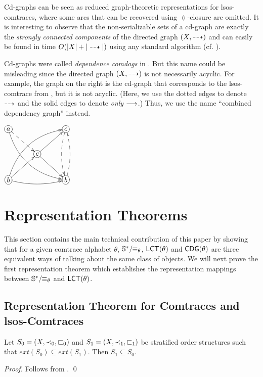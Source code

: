 \documentclass{llncs}
\begin{document}
Cd-graphs can be seen as reduced graph-theoretic representations for lsos-comtraces, where some arcs that can be recovered using $\lozenge$-closure are omitted. It is interesting to observe that the non-serializable sets of a cd-graph are exactly the \emph{strongly connected components} of the directed graph $(X,\dashrightarrow)$ and can easily be found in time $O(|X|+|\dashrightarrow|)$ using any standard algorithm (cf. \cite[Section 22.5]{CLR}). \smallskip\\
\begin{minipage}{8.2cm}\begin{remark} Cd-graphs were called \emph{dependence comdags} in \cite{KK08}. But this name could be misleading since the directed graph $(X,\dashrightarrow)$ is not necessarily acyclic. For example, the graph on the right is the cd-graph that corresponds to  the lsos-comtrace from , but it is not acyclic. (Here, we use the dotted edges to denote $\dashrightarrow$ and the solid edges to denote \emph{only} $\longrightarrow$.) Thus, we use the name ``combined dependency graph'' instead. \EOD\end{remark}
\end{minipage}
\begin{minipage}{4cm}\centering
$\xymatrix@C=3em @R=2.5em{
*+[o][F-]{a} \ar@{-->}[dr] \ar@/_1.5pc/ [ddrr] & 	& *+[o][F-]{c}\ar@/_/ @{-->}[dd]\\
 		 &*+[o][F-]{c} \ar[ur]\ar[dr]		&\\
*+[o][F-]{b} \ar[ur]\ar@/_/[rr]\ar@/^1.5pc/ [uurr]  &	&*+[o][F-]{b}\ar@/_/ @{-->}[uu]
}$
\end{minipage}




\section{Representation Theorems \label{sec:representation}}
This section contains the main technical contribution of this paper by showing that for a given comtrace alphabet $\theta$, $\mathbb{S}^*/\!\!\equiv_{\theta}$, $\mathsf{LCT}(\theta)$ and $\mathsf{CDG}(\theta)$ are three equivalent ways of talking about the same class of objects. We will next prove the first representation theorem which establishes the representation mappings between $\mathbb{S}^*/\!\!\equiv_{\theta}$ and $\mathsf{LCT}(\theta)$.

\subsection{Representation Theorem for Comtraces and lsos-Comtraces}
\begin{proposition}
Let $S_0=(X,\prec_0,\sqsubset_0)$ and $S_1=(X,\prec_1,\sqsubset_1)$ be stratified order structures such that $ext(S_0)\subseteq ext(S_1)$. Then $S_1\subseteq S_0$.
\label{prop:stratsubset}
\end{proposition}
\begin{proof} Follows from . \qed
\end{proof}
\end{document}

